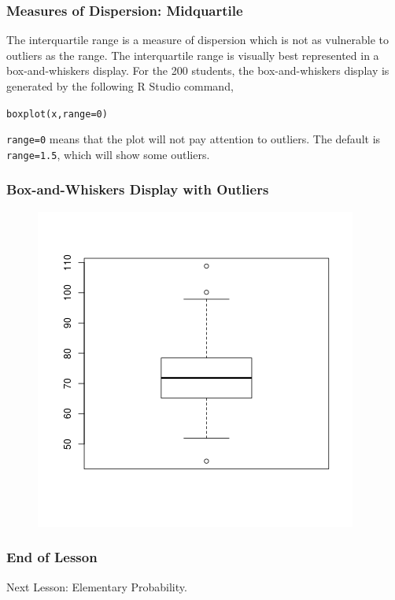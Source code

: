 \documentclass[xcolor=dvipsnames]{beamer}
\begin{document}
\begin{frame}
  \frametitle{Measures of Dispersion: Midquartile}
The \alert{interquartile range} is a measure of dispersion which is not as
vulnerable to outliers as the range. The interquartile range is
visually best represented in a box-and-whiskers display. For the 200
students, the box-and-whiskers display is generated by the following R
Studio command,
\begin{alltt}
boxplot(x,range=0)
\end{alltt}
\texttt{range=0} means that the plot will not pay attention to
outliers. The default is \texttt{range=1.5}, which will show some outliers.
\end{frame}


\begin{frame}
  \frametitle{Box-and-Whiskers Display with Outliers}
\begin{figure}[h]
\includegraphics[scale=.6]{./box1.png}
\end{figure}
\end{frame}

\begin{frame}
  \frametitle{End of Lesson}
Next Lesson: Elementary Probability.
\end{frame}
\end{document}
